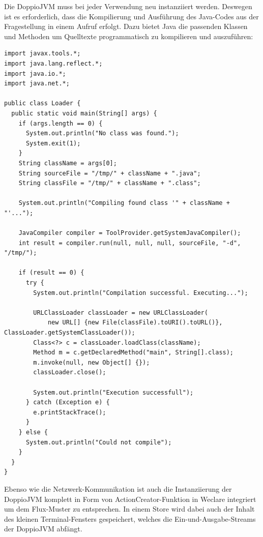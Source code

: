 Die DoppioJVM muss bei jeder Verwendung neu instanziiert werden. Deswegen ist es erforderlich, dass die Kompilierung und Ausführung des Java-Codes aus der Fragestellung in einem Aufruf erfolgt. Dazu bietet Java die passenden Klassen und Methoden um Quelltexte programmatisch zu kompilieren und auszuführen:

\begin{minipage}{\linewidth}
\begin{lstlisting}[caption={Java-Loader, der programmatisch Quelltext kompiliert und ausführt. (aus: public/doppio/Loader.java)}]
import javax.tools.*;
import java.lang.reflect.*;
import java.io.*;
import java.net.*;

public class Loader {
  public static void main(String[] args) {
    if (args.length == 0) {
      System.out.println("No class was found.");
      System.exit(1);
    }
    String className = args[0];
    String sourceFile = "/tmp/" + className + ".java";
    String classFile = "/tmp/" + className + ".class";

    System.out.println("Compiling found class '" + className + "'...");

    JavaCompiler compiler = ToolProvider.getSystemJavaCompiler();
    int result = compiler.run(null, null, null, sourceFile, "-d", "/tmp/");

    if (result == 0) {
      try {
        System.out.println("Compilation successful. Executing...");

        URLClassLoader classLoader = new URLClassLoader(
            new URL[] {new File(classFile).toURI().toURL()}, ClassLoader.getSystemClassLoader());
        Class<?> c = classLoader.loadClass(className);
        Method m = c.getDeclaredMethod("main", String[].class);
        m.invoke(null, new Object[] {});
        classLoader.close();

        System.out.println("Execution successfull");
      } catch (Exception e) {
        e.printStackTrace();
      }
    } else {
      System.out.println("Could not compile");
    }
  }
}
\end{lstlisting}
\end{minipage}

Ebenso wie die Netzwerk-Kommunikation ist auch die Instanziierung der DoppioJVM komplett in Form von ActionCreator-Funktion in Weclare integriert um dem Flux-Muster zu entsprechen. In einem Store wird dabei auch der Inhalt des kleinen Terminal-Fensters gespeichert, welches die Ein-und-Ausgabe-Streams der DoppioJVM abfängt.

